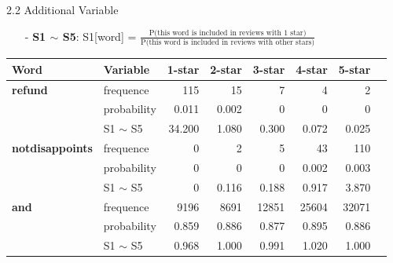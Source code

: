 \documentclass[10pt]{beamer}
\begin{document}
\begin{frame}{2.2 Additional Variable}

\begin{itemize}
	\item[-] \textbf{S1 $\sim$ S5}: S1[word] = $\frac{\text{P(this word is included in reviews with 1 star)}}{\text{P(this word is included in reviews with other stars)}}$
\end{itemize}

\begin{table}[ht]

\centering %
\begin{tabular}{l l r r r r r r} %
\hline %
Word   &Variable  & 1-star & 2-star & 3-star & 4-star & 5-star  \\ [0.5ex] %
\hline %
\textbf{refund}         & frequence   & 115    & 15     & 7      & 4      & 2      \\
                 & probability & 0.011  & 0.002  & 0      & 0      & 0      \\
                  & S1 $\sim$ S5     & 34.200 & 1.080  & 0.300  & 0.072  & 0.025  \\
\hline
\textbf{notdisappoints} & frequence   & 0      & 2      & 5      & 43     & 110   \\
                    & probability & 0      & 0      & 0      & 0.002  & 0.003  \\
                    & S1 $\sim$ S5     & 0      & 0.116  & 0.188  & 0.917  & 3.870  \\
 \hline
 \textbf{and}            & frequence   & 9196   & 8691   & 12851  & 25604  & 32071  \\
                    & probability & 0.859  & 0.886  & 0.877  & 0.895  & 0.886  \\
                    & S1 $\sim$ S5     & 0.968  & 1.000  & 0.991  & 1.020  & 1.000  \\

\hline %
\end{tabular}
\label{table:nonlin} %
\end{table}

\end{frame}
\end{document}
